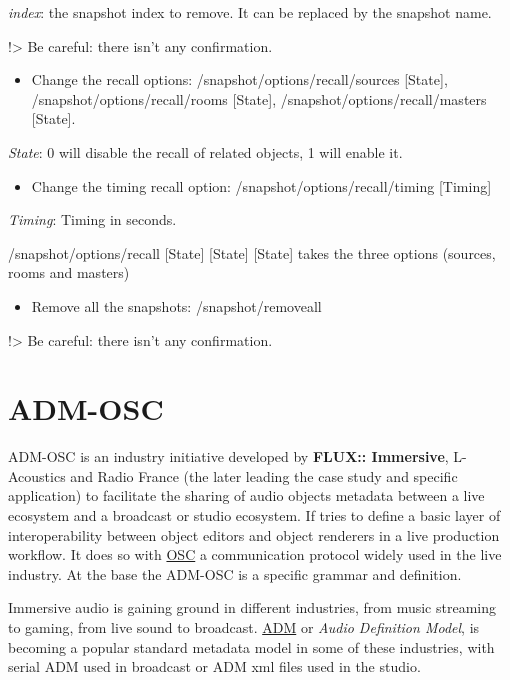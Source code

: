 \documentclass[
  letterpaper,
  DIV=11,
  numbers=noendperiod]{scrreport}
\providecommand{\tightlist}{%
  \setlength{\itemsep}{0pt}\setlength{\parskip}{0pt}}\usepackage{longtable,booktabs,array}
\begin{document}
\emph{index}: the snapshot index to remove. It can be replaced by the
snapshot name.

!\textgreater{} Be careful: there isn't any confirmation.

\begin{itemize}
\tightlist
\item
  Change the recall options: /snapshot/options/recall/sources
  {[}State{]}, /snapshot/options/recall/rooms {[}State{]},
  /snapshot/options/recall/masters {[}State{]}.
\end{itemize}

\emph{State}: 0 will disable the recall of related objects, 1 will
enable it.

\begin{itemize}
\tightlist
\item
  Change the timing recall option: /snapshot/options/recall/timing
  {[}Timing{]}
\end{itemize}

\emph{Timing}: Timing in seconds.

/snapshot/options/recall {[}State{]} {[}State{]} {[}State{]} takes the
three options (sources, rooms and masters)

\begin{itemize}
\tightlist
\item
  Remove all the snapshots: /snapshot/removeall
\end{itemize}

!\textgreater{} Be careful: there isn't any confirmation.

\hypertarget{adm-osc}{%
\chapter{ADM-OSC}\label{adm-osc}}

ADM-OSC is an industry initiative developed by \textbf{FLUX::
Immersive}, L-Acoustics and Radio France (the later leading the case
study and specific application) to facilitate the sharing of audio
objects metadata between a live ecosystem and a broadcast or studio
ecosystem. If tries to define a basic layer of interoperability between
object editors and object renderers in a live production workflow. It
does so with
\href{https://opensoundcontrol.stanford.edu/index.html}{OSC} a
communication protocol widely used in the live industry. At the base the
ADM-OSC is a specific grammar and definition.

Immersive audio is gaining ground in different industries, from music
streaming to gaming, from live sound to broadcast.
\href{https://adm.ebu.io/}{ADM} or \emph{Audio Definition Model}, is
becoming a popular standard metadata model in some of these industries,
with serial ADM used in broadcast or ADM xml files used in the studio.
\end{document}
